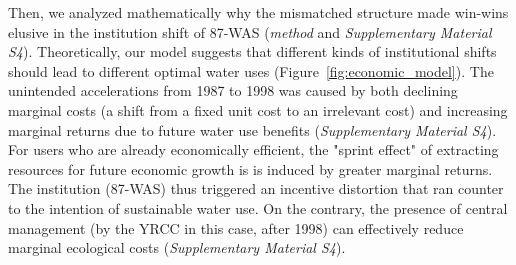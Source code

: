 Then, we analyzed mathematically why the mismatched structure made win-wins elusive in the institution shift of 87-WAS (\textit{method} and \textit{Supplementary Material S4}).
Theoretically, our model suggests that different kinds of institutional shifts should lead to different optimal water uses (Figure~\ref{fig:economic_model}).
The unintended accelerations from 1987 to 1998 was caused by both declining marginal costs (a shift from a fixed unit cost to an irrelevant cost) and increasing marginal returns due to future water use benefits (\textit{Supplementary Material S4}).
For users who are already economically efficient, the "sprint effect" of extracting resources for future economic growth is is induced by greater marginal returns.
The institution (87-WAS) thus triggered an incentive distortion that ran counter to the intention of sustainable water use.
On the contrary, the presence of central management (by the YRCC in this case, after 1998) can effectively reduce marginal ecological costs (\textit{Supplementary Material S4}).

